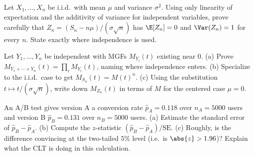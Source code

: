 \begin{exercise}
\label{ch21:ex-proof-std}
Let $X_1, \dots, X_n$ be i.i.d.\ with mean $\mu$ and variance $\sigma^2$. Using only
linearity of expectation and the additivity of variance for independent variables, prove
carefully that $Z_n = (S_n - n\mu)/(\sigma\sqrt n)$ has $\E[Z_n] = 0$ and
$\Var(Z_n) = 1$ for every $n$. State exactly where independence is used.
\end{exercise}

\begin{exercise}
\label{ch21:ex-proof-mgf}
Let $Y_1, \dots, Y_n$ be independent with MGFs $M_{Y_i}(t)$ existing near $0$. (a) Prove
$M_{Y_1 + \cdots + Y_n}(t) = \prod_i M_{Y_i}(t)$, naming where independence enters.
(b) Specialize to the i.i.d.\ case to get $M_{S_n}(t) = M(t)^n$. (c) Using the
substitution $t \mapsto t/(\sigma\sqrt n)$, write down $M_{Z_n}(t)$ in terms of $M$ for
the centered case $\mu = 0$.
\end{exercise}

\begin{exercise}
\label{ch21:ex-twosample}
An A/B test gives version A a conversion rate $\hat p_A = 0.118$ over $n_A = 5000$ users
and version B $\hat p_B = 0.131$ over $n_B = 5000$ users. (a) Estimate the standard error
of $\hat p_B - \hat p_A$. (b) Compute the $z$-statistic
$(\hat p_B - \hat p_A)/\text{SE}$. (c) Roughly, is the difference convincing at the
two-tailed $5\%$ level (i.e.\ is $\abs{z} > 1.96$)? Explain what the CLT is doing in
this calculation.
\end{exercise}
